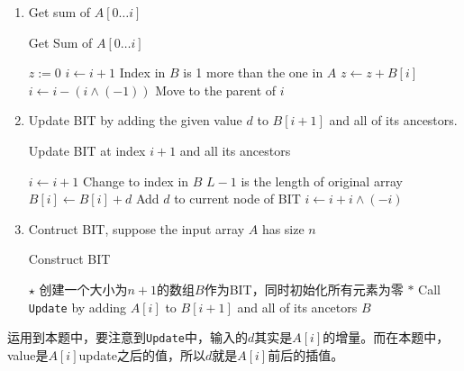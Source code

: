 \begin{enumerate}
\item Get sum of $A[0\ldots i]$
\setcounter{algorithm}{0}
\begin{algorithm}[H]
\caption{Get Sum of $ A[0\ldots i] $}
\begin{algorithmic}[1]
\State $z:=0$
\State $i\gets i+1$ \Comment Index in $ B $ is 1 more than the one in $ A $
\State $z\gets z+B[i]$
\State $i\gets i - (i\land (-1))$ \Comment Move to the parent of $i$
\EndWhile 
\EndProcedure
\end{algorithmic}
\end{algorithm}
\item Update BIT by adding the given value $ d $ to $B[i+1]$ and all of its ancestors.
\begin{algorithm}[H]
\caption{Update BIT at index $ i+1 $ and all its ancestors}
\begin{algorithmic}[1]
\State $i\gets i+1$ \Comment Change to index in $B$
 \Comment $L-1$ is the length of original array
\State $ B[i]\gets B[i] + d $ \Comment Add $ d $ to current node of BIT
\State $ i\gets i + i\land(-i)  $
\EndWhile
\EndProcedure
\end{algorithmic}
\end{algorithm}
\item Contruct BIT, suppose the input array $A$ has size $ n $
\begin{algorithm}[H]
\caption{Construct BIT}
\begin{algorithmic}[1]
\State $\star$ 创建一个大小为$ n+1 $的数组$B$作为BIT，同时初始化所有元素为零
\State $\ast$ Call \texttt{Update} by adding $A[i]$ to $B[i+1]$ and all of its ancetors
\State {}
\EndFor 
\State \Return $ B $
\EndProcedure
\end{algorithmic}
\end{algorithm}
\end{enumerate}
运用到本题中，要注意到\texttt{Update}中，输入的$d$其实是$A[i]$的增量。而在本题中，value是$A[i]$update之后的值，所以$d$就是$ A[i] $前后的插值。
\setcounter{lstlisting}{0}
